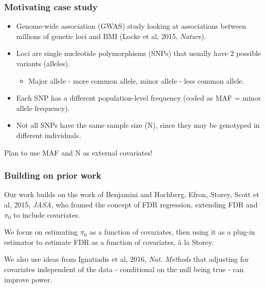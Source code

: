 \documentclass{beamer}
\begin{document}
\begin{frame}
\frametitle{Motivating case study}

\begin{itemize}
\item Genome-wide association ({\color{red}GWAS}) study looking at associations between millions of genetic loci and BMI (Locke et al, 2015, \textit{Nature}).
\item Loci are single nucleotide polymorphisms (SNPs) that usually have 2 possible variants (alleles).
\begin{itemize}
\item Major allele - more common allele, minor allele - less common allele.
\end{itemize}
\item Each SNP has a different population-level frequency (coded as {\color{red}MAF = minor allele frequency}).
\item Not all SNPs have the same sample size ({\color{red}N}), since they may be genotyped in different individuals.
\end{itemize}

\vspace{0.5cm}Plan to use MAF and N as external covariates!

\end{frame}



\begin{frame}
\frametitle{Building on prior work}

Our work builds on the work of Benjamini and Hochberg, Efron, Storey, Scott et al, 2015, \textit{JASA},
who framed the concept of {\color{red}FDR regression}, extending FDR and $\pi_0$ to include covariates.\\ \vspace{0.5cm}

We focus on estimating $\pi_0$ as a function of covariates, then using it as a plug-in estimator to estimate FDR as a function of
covariates, \`{a} la Storey.\\ \vspace{0.5cm}

We also use ideas from Ignatiadis et al, 2016, \textit{Nat. Methods} that adjusting for covariates independent of the data - conditional on 
the null being true - can improve power.

\end{frame}
\end{document}
